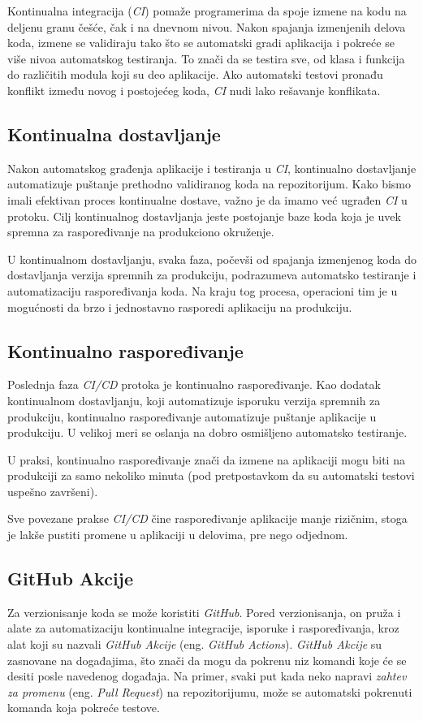 Kontinualna integracija (\textit{CI}) pomaže programerima da spoje izmene na kodu na deljenu granu češće, 
čak i na dnevnom nivou. Nakon spajanja izmenjenih delova koda, izmene se validiraju tako što se 
automatski gradi aplikacija i pokreće se više nivoa automatskog testiranja. To znači da se testira 
sve, od klasa i funkcija do različitih modula koji su deo aplikacije. Ako automatski testovi pronađu 
konflikt između novog i postojećeg koda, \textit{CI} nudi lako rešavanje konflikata.

\subsection{Kontinualna dostavljanje}
Nakon automatskog građenja aplikacije i testiranja u \textit{CI}, kontinualno dostavljanje automatizuje 
puštanje prethodno validiranog koda na repozitorijum. Kako bismo imali efektivan proces kontinualne 
dostave, važno je da imamo već ugrađen \textit{CI} u protoku. Cilj kontinualnog dostavljanja jeste postojanje 
baze koda koja je uvek spremna za raspoređivanje na produkciono okruženje.

U kontinualnom dostavljanju, svaka faza, počevši od spajanja izmenjenog koda do dostavljanja 
verzija spremnih za produkciju, podrazumeva automatsko testiranje i automatizaciju raspoređivanja 
koda. Na kraju tog procesa, operacioni tim je u mogućnosti da brzo i jednostavno rasporedi 
aplikaciju na produkciju.

\subsection{Kontinualno raspoređivanje}
Poslednja faza \textit{CI/CD} protoka je kontinualno raspoređivanje. Kao dodatak kontinualnom dostavljanju, 
koji automatizuje isporuku verzija spremnih za produkciju, kontinualno raspoređivanje automatizuje 
puštanje aplikacije u produkciju. U velikoj meri se oslanja na dobro osmišljeno automatsko testiranje.

U praksi, kontinualno raspoređivanje znači da izmene na aplikaciji mogu biti na produkciji za samo 
nekoliko minuta (pod pretpostavkom da su automatski testovi uspešno završeni).

Sve povezane prakse \textit{CI/CD} čine raspoređivanje aplikacije manje rizičnim, stoga je lakše pustiti 
promene u aplikaciji u delovima, pre nego odjednom.~\cite{CI_CD}

\subsection{GitHub Akcije}
Za verzionisanje koda se može koristiti \textit{GitHub}. Pored verzionisanja, on pruža i alate za automatizaciju 
kontinualne integracije, isporuke i raspoređivanja, kroz alat koji su nazvali \textit{GitHub Akcije} 
(eng. \textit{GitHub Actions}). 
\textit{GitHub Akcije} su zasnovane na događajima, što znači da mogu da pokrenu niz komandi koje će se desiti 
posle navedenog događaja. Na primer, svaki put kada neko napravi \textit{zahtev za promenu} 
(eng. \textit{Pull Request}) na repozitorijumu, može se automatski pokrenuti komanda koja pokreće 
testove. 


